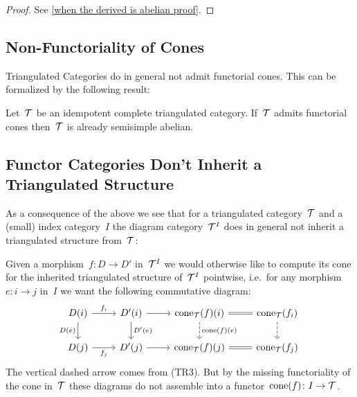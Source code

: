 \documentclass[a4paper,10pt]{scrartcl}
\begin{document}
\begin{proof}
  See \cref{when the derived is abelian proof}.
\end{proof}



\subsection{Non-Functoriality of Cones}

Triangulated Categories do in general not admit functorial cones.
This can be formalized by the following result:

\begin{proposition}
  Let~$\mathcal{T}$ be an idempotent complete triangulated category.
  If~$\mathcal{T}$ admits functorial cones then~$\mathcal{T}$ is already semisimple abelian.
\end{proposition}



\subsection{Functor Categories Don’t Inherit a Triangulated Structure}

As a consequence of the above we see that for a triangulated category~$\mathcal{T}$ and a (small) index category~$I$ the diagram category~$\mathcal{T}^I$ does in general not inherit a triangulated structure from~$\mathcal{T}$:

Given a morphism~$f \colon D \to D'$ in~$\mathcal{T}^I$ we would otherwise like to compute its cone for the inherited triangulated structure of~$\mathcal{T}^I$ pointwise, i.e.\ for any morphism~$e \colon i \to j$ in~$I$ we want the following commutative diagram:
\[
  \begin{tikzcd}
    D(i)
    \arrow{r}[above]{f_i}
    \arrow{d}[left]{D(e)}
    &
    D'(i)
    \arrow{d}[right]{D'(e)}
    \arrow{r}
    &
    \cone_{\Tcat}(f)(i)
    \arrow[equal]{r}
    \arrow[dashed]{d}[right]{\cone(f)(e)}
    &
    \cone_{\Tcat}(f_i)
    \arrow[dashed]{d}
    \\
    D(j)
    \arrow{r}[below]{f_j}
    &
    D'(j)
    \arrow{r}
    &
    \cone_{\Tcat}(f)(j)
    \arrow[equal]{r}
    &
    \cone_{\Tcat}(f_j)
  \end{tikzcd}
\]
The vertical dashed arrow comes from (TR3).
But by the missing functoriality of the cone in~$\mathcal{T}$ these diagrams do not assemble into a functor~$\operatorname{cone}(f) \colon I \to \mathcal{T}$.
\end{document}
